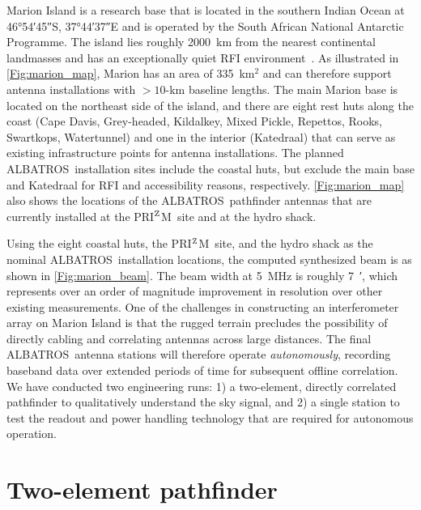 \documentclass{ws-jai}
\def\albatros{ALBATROS}
\def\prizm{PRI$^{\rm Z}$M}
\begin{document}
Marion Island is a research base that is located in the southern
Indian Ocean at \ang{46;54;45}S, \ang{37;44;37}E and is operated by
the South African National Antarctic Programme.  The island lies
roughly \SI{2000}{\kilo\metre} from the nearest continental landmasses
and has an exceptionally quiet RFI
environment~\citep{2019JAI.....850004P}.  As illustrated in
\autoref{Fig:marion_map}, Marion has an area of 335~km$^2$ and can
therefore support antenna installations with $>10$-km baseline
lengths.  The main Marion base is located on the northeast side of the
island, and there are eight rest huts along the coast (Cape Davis,
Grey-headed, Kildalkey, Mixed Pickle, Repettos, Rooks, Swartkops,
Watertunnel) and one in the interior (Katedraal) that can serve as
existing infrastructure points for antenna installations.  The planned
\albatros\ installation sites include the coastal huts, but exclude
the main base and Katedraal for RFI and accessibility reasons,
respectively.  \autoref{Fig:marion_map} also shows the locations of
the \albatros\ pathfinder antennas that are currently installed at the
\prizm\ site and at the hydro shack.

Using the eight coastal huts, the \prizm\ site, and the hydro shack as
the nominal \albatros\ installation locations, the computed
synthesized beam is as shown in \autoref{Fig:marion_beam}.  The beam
width at 5~MHz is roughly \SI{7}{\arcminute}, which represents over an
order of magnitude improvement in resolution over other existing
measurements.  One of the challenges in constructing an interferometer
array on Marion Island is that the rugged terrain precludes the
possibility of directly cabling and correlating antennas across large
distances.  The final \albatros\ antenna stations will therefore
operate {\it autonomously}, recording baseband data over extended
periods of time for subsequent offline correlation.  We have conducted
two engineering runs: 1) a two-element, directly correlated pathfinder
to qualitatively understand the sky signal, and 2) a single station to
test the readout and power handling technology that are required for
autonomous operation.

\section{Two-element pathfinder}\label{s:2elem}
\end{document}
